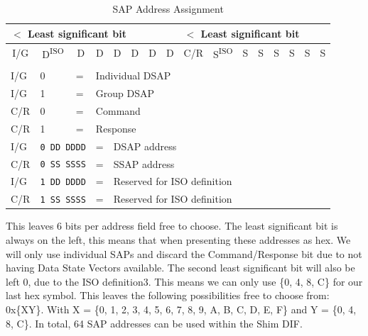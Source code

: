 \begin{table}[H]
	\begin{center}
		\begin{tabular}{|c|c|c|c|c|c|c|c|c|c|c|c|c|c|c|c|}
				\multicolumn{8}{|l|}{$<$ Least significant bit} & \multicolumn{8}{l|}{$<$ Least significant bit} \\
				\hline
				I/G & D\textsuperscript{ISO} & D & D & D & D & D & D & C/R & S\textsuperscript{ISO} & S & S & S & S & S & S \\
				\hline
				\multicolumn{16}{l}{} \\
				\multicolumn{1}{l}{I/G} & \multicolumn{1}{l}{0} & \multicolumn{1}{l}{=} & \multicolumn{13}{l}{Individual DSAP} \\
				\multicolumn{1}{l}{I/G} & \multicolumn{1}{l}{1} & \multicolumn{1}{l}{=} & \multicolumn{13}{l}{Group DSAP} \\
				\multicolumn{1}{l}{C/R} & \multicolumn{1}{l}{0} & \multicolumn{1}{l}{=} & \multicolumn{13}{l}{Command} \\
				\multicolumn{1}{l}{C/R} & \multicolumn{1}{l}{1} & \multicolumn{1}{l}{=} & \multicolumn{13}{l}{Response} \\
				\multicolumn{1}{l}{I/G} &  \multicolumn{2}{l}{\texttt{0 DD DDDD}} & \multicolumn{1}{l}{=} & \multicolumn{12}{l}{DSAP address} \\
				\multicolumn{1}{l}{C/R} &  \multicolumn{2}{l}{\texttt{0 SS SSSS}} & \multicolumn{1}{l}{=} & \multicolumn{12}{l}{SSAP address} \\
				\multicolumn{1}{l}{I/G} &  \multicolumn{2}{l}{\texttt{1 DD DDDD}} & \multicolumn{1}{l}{=} & \multicolumn{12}{l}{Reserved for ISO definition} \\
				\multicolumn{1}{l}{C/R} &  \multicolumn{2}{l}{\texttt{1 SS SSSS}} & \multicolumn{1}{l}{=} & \multicolumn{12}{l}{Reserved for ISO definition} \\
				
				
		\end{tabular}
		\caption{SAP Address Assignment}
	\end{center}
\end{table}

\npar

This leaves 6 bits per address field free to choose. The least significant bit is always on the left, this means that when presenting these addresses as hex. We will only use individual SAPs and discard the Command/Response bit due to not having Data State Vectors available. The second least significant bit will also be left 0, due to the ISO definition3. This means we can only use \{0, 4, 8, C\} for our last hex symbol. This leaves the following possibilities free to choose from: 0x\{XY\}. With X = \{0, 1, 2, 3, 4, 5, 6, 7, 8, 9, A, B, C, D, E, F\} and Y = \{0, 4, 8, C\}. In total, 64 SAP addresses can be used within the Shim DIF.



